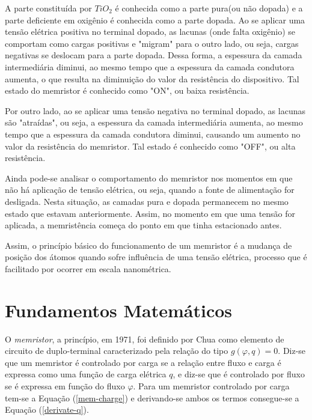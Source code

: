\documentclass{ceel}
\begin{document}
\begin{multicols}{2}
A parte constituída por $TiO_2$ é conhecida como a parte pura(ou não dopada) e a parte deficiente em oxigênio é conhecida como a parte dopada. Ao se aplicar uma tensão elétrica positiva 
no terminal dopado, as lacunas (onde falta oxigênio) se comportam como cargas positivas e "migram" para o outro lado, ou seja, cargas negativas se deslocam para a parte dopada. Dessa 
forma, a espessura da camada intermediária diminui, ao mesmo tempo que a espessura da camada condutora aumenta, o que resulta na diminuição do valor da resistência do dispositivo. Tal 
estado do memristor é conhecido como "ON", ou baixa resistência. %

Por outro lado, ao se aplicar uma tensão negativa no terminal dopado, as lacunas são "atraídas", ou seja, a espessura da camada intermediária aumenta, ao mesmo tempo que a espessura 
da camada condutora diminui, causando um aumento no valor da resistência do memristor. Tal estado é conhecido como "OFF", ou alta resistência. 

Ainda pode-se analisar o comportamento do memristor nos momentos em que não há aplicação de tensão elétrica, ou seja, quando a fonte de alimentação for desligada. Nesta situação, as 
camadas pura e dopada permanecem no mesmo estado que estavam anteriormente. Assim, no momento em que uma tensão for aplicada, a memristência começa do ponto em que tinha 
estacionado antes. %

Assim, o princípio básico do funcionamento de um memristor é a mudança de posição dos átomos quando sofre influência de uma tensão elétrica, processo que é facilitado por ocorrer em 
escala nanométrica. %

\section{Fundamentos Matemáticos}\label{analise-matematica}
O \emph{memristor}, a princípio, em 1971, foi definido por Chua \cite{artigo} como elemento de circuito de duplo-terminal caracterizado pela relação do tipo $g(\varphi, q)=0$. Diz-se que 
um memristor é controlado por carga se a relação entre fluxo e carga é expressa como uma função de carga elétrica $q$, e diz-se que é controlado por fluxo se é expressa em função do 
fluxo $\varphi$. Para um memristor controlado por carga tem-se a Equação (\ref{mem-charge}) e derivando-se ambos os termos consegue-se a Equação (\ref{derivate-q}).


\end{multicols}
\end{document}
